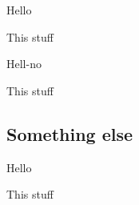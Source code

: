 \documentclass[
  ignorenonframetext,
]{beamer}
\begin{document}
\begin{frame}{Hello}
\protect\hypertarget{hello-13}{}

This stuff

\end{frame}

\begin{frame}{Hell-no}
\protect\hypertarget{hell-no-3}{}

This stuff

\end{frame}

\hypertarget{something-else-3}{%
\subsection{Something else}\label{something-else-3}}

\begin{frame}{Hello}
\protect\hypertarget{hello-14}{}

This stuff

\end{frame}
\end{document}
